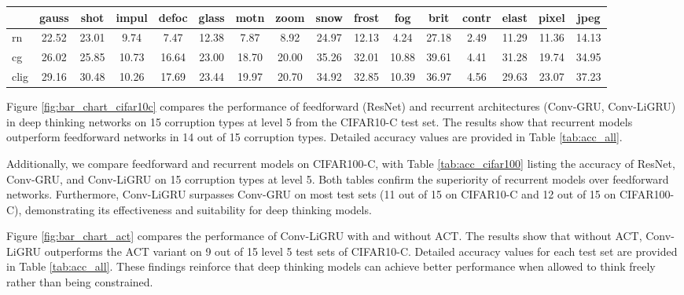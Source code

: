 \begin{table*}[t]
\setlength{\tabcolsep}{3pt} 
\centering
\caption{Test accuracy (\%) on CIFAR100-C, level 5, ResNet, Conv-GRU, Conv-LiGRU}
\begin{tabular}{l|ccccccccccccccc}
\toprule
& gauss & shot & impul & defoc & glass & motn & zoom & snow & frost & fog & brit & contr & elast & pixel & jpeg \\
\midrule
rn & 22.52 & 23.01 & 9.74 & 7.47 & 12.38 & 7.87 & 8.92 & 24.97 & 12.13 & 4.24 & 27.18 & 2.49 & 11.29 & 11.36 & 14.13 \\
cg & 26.02 & 25.85 & 10.73 & 16.64 & 23.00 & 18.70 & 20.00 & 35.26 & 32.01 & 10.88 & 39.61 & 4.41 & 31.28 & 19.74 & 34.95 \\
clig & 29.16 & 30.48 & 10.26 & 17.69 & 23.44 & 19.97 & 20.70 & 34.92 & 32.85 & 10.39 & 36.97 & 4.56 & 29.63 & 23.07 & 37.23 \\
\bottomrule
\end{tabular}
\label{tab:acc_cifar100}
\end{table*}

Figure \ref{fig:bar_chart_cifar10c} compares the performance of feedforward (ResNet) and recurrent architectures (Conv-GRU, Conv-LiGRU) in deep thinking networks on 15 corruption types at level 5 from the CIFAR10-C test set. The results show that recurrent models outperform feedforward networks in 14 out of 15 corruption types. Detailed accuracy values are provided in Table \ref{tab:acc_all}.

Additionally, we compare feedforward and recurrent models on CIFAR100-C, with Table \ref{tab:acc_cifar100} listing the accuracy of ResNet, Conv-GRU, and Conv-LiGRU on 15 corruption types at level 5. Both tables confirm the superiority of recurrent models over feedforward networks. Furthermore, Conv-LiGRU surpasses Conv-GRU on most test sets (11 out of 15 on CIFAR10-C and 12 out of 15 on CIFAR100-C), demonstrating its effectiveness and suitability for deep thinking models.

Figure \ref{fig:bar_chart_act} compares the performance of Conv-LiGRU with and without ACT. The results show that without ACT, Conv-LiGRU outperforms the ACT variant on 9 out of 15 level 5 test sets of CIFAR10-C. Detailed accuracy values for each test set are provided in Table \ref{tab:acc_all}. These findings reinforce that deep thinking models can achieve better performance when allowed to think freely rather than being constrained.

